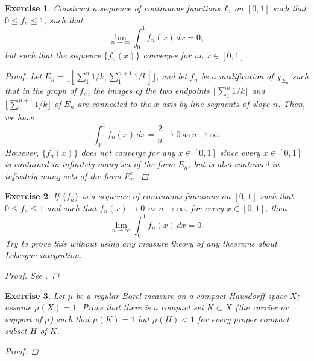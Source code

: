 \documentclass[10pt,letterpaper]{amsart}
\newtheorem{exercise}{Exercise}[section]
\theoremstyle{definition}
\theoremstyle{remark}
\numberwithin{equation}{exercise}
\begin{document}
\begin{multicols}{2}
  \begin{exercise}
    Construct a sequence of continuous functions $f_n$ on $[0,1]$ such that $0
    \le f_n \le 1$, such that
    \begin{equation*}
      \lim_{n \to \infty} \int_0^1 f_n(x)\,dx = 0,
    \end{equation*}
    but such that the sequence $\{f_n(x)\}$ converges for no $x \in [0,1]$.
    \begin{proof}
      Let $E_n = \lfloor [\sum_1^n 1/k, \sum_1^{n+1} 1/k] \rfloor$, and let
      $f_n$ be a modification of $\chi_{E_n}$ such that in the graph of $f_n$,
      the images of the two endpoints $\lfloor \sum_1^n 1/k \rfloor$ and
      $\lfloor \sum_1^{n+1} 1/k \rfloor$ of $E_n$ are connected to the $x$-axis
      by line segments of slope $n$. Then, we have
      \begin{equation*}
        \int_0^1 f_n(x)\,dx = \frac{2}{n} \to 0\ \text{as}\ n \to \infty.
      \end{equation*}
      However, $\{f_n(x)\}$ does not converge for any $x \in [0,1]$ since every
      $x \in [0,1]$ is contained in infinitely many set of the form $E_n$,
      but is also contained in infinitely many sets of the form $E_n^c$.
    \end{proof}
  \end{exercise}
  \begin{exercise}
    If $\{f_n\}$ is a sequence of continuous functions on $[0,1]$ such that $0
    \le f_n \le 1$ and such that $f_n(x) \to 0$ as $n \to \infty$, for every $x
    \in [0,1]$, then
    \begin{equation*}
      \lim_{n \to \infty} \int_0^1 f_n(x)\,dx = 0.
    \end{equation*}
    Try to prove this without using any measure theory of any theorems about
    Lebesgue integration.
    \begin{proof}
      See \cite{Ebe57}.
    \end{proof}
  \end{exercise}
  \begin{exercise}
    Let $\mu$ be a regular Borel measure on a compact Hausdorff space $X$;
    assume $\mu(X) = 1$. Prove that there is a compact set $K \subset X$ (the
    \emph{carrier} or \emph{support} of $\mu$) such that $\mu(K) = 1$ but
    $\mu(H) < 1$ for every proper compact subset $H$ of $K$.
    \begin{proof}

\end{proof}
\end{exercise}
\end{multicols}
\end{document}
